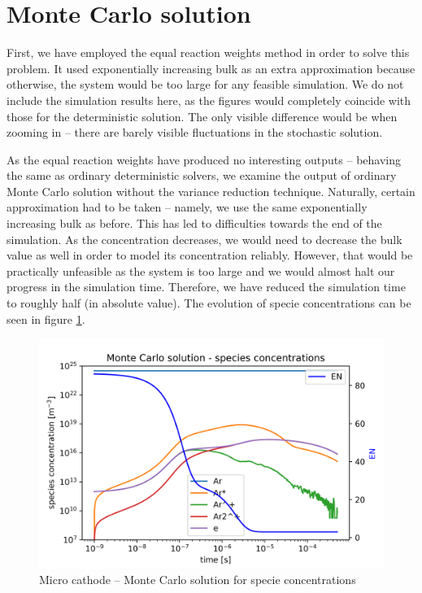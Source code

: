\section{Monte Carlo solution}

First, we have employed the equal reaction weights method in order to solve this problem. It used exponentially increasing bulk as an extra approximation because otherwise, the system would be too large for any feasible simulation. We do not include the simulation results here, as the figures would completely coincide with those for the deterministic solution. The only visible difference would be when zooming in -- there are barely visible fluctuations in the stochastic solution.

As the equal reaction weights have produced no interesting outputs -- behaving the same as ordinary deterministic solvers, we examine the output of ordinary Monte Carlo solution without the variance reduction technique. Naturally, certain approximation had to be taken -- namely, we use the same exponentially increasing bulk as before. This has led to difficulties towards the end of the simulation. As the  concentration decreases, we would need to decrease the bulk value as well in order to model its concentration reliably. However, that would be practically unfeasible as the system is too large and we would almost halt our progress in the simulation time. Therefore, we have reduced the simulation time to roughly half (in absolute value). The evolution of specie concentrations can be seen in figure \ref{fig:MicroCathodeImprovedMC}.

\begin{figure} 
    \centering
    \includegraphics[width=\textwidth]{grafy/MicroCathodeImprovedMC.png}
    \caption{Micro cathode -- Monte Carlo solution for specie concentrations}
    \label{fig:MicroCathodeImprovedMC}
\end{figure}


